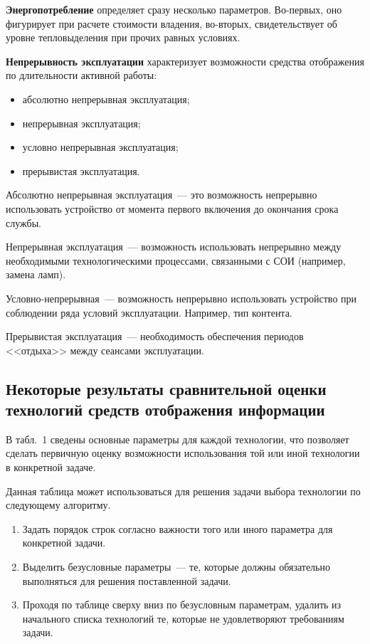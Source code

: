 \begin{multicols}{2}
   \textbf{Энергопотребление} определяет сразу несколько параметров. 
   Во-первых, оно фигурирует при расчете стоимости владения, во-вторых, 
свидетельствует об уровне тепловыделения при прочих равных условиях. 
   
   \textbf{Непрерывность эксплуатации} характеризует возможности 
средства отображения по длительности активной работы: 
   \begin{itemize}
\item абсолютно непрерывная эксплуатация;
\item непрерывная эксплуатация;
\item условно непрерывная эксплуатация;
\item прерывистая эксплуатация.
\end{itemize}
   
   Абсолютно непрерывная эксплуатация~--- это возможность непрерывно 
использовать устройство от момента первого включения до окончания срока 
службы. 
   
   Непрерывная эксплуатация~--- возможность использовать непрерывно 
между необходимыми технологическими процессами, связанными с СОИ 
(например, замена ламп). 
   
   Условно-непрерывная~--- возможность непрерывно использовать 
устройство при соблюдении ряда условий эксплуатации. Например, тип 
контента. 
   
   Прерывистая эксплуатация~--- необходимость обеспечения периодов 
<<отдыха>> между сеансами эксплуатации. 

\subsection{Некоторые результаты сравнительной оценки технологий 
средств отображения информации} %

     В табл.~1 сведены основные параметры для каж\-дой технологии, что 
позволяет сделать первичную оценку возможности использования той или 
иной технологии в конкретной задаче. 


     Данная таблица может использоваться для решения задачи выбора 
технологии по следующему алгоритму.
     \begin{enumerate}[1.]
\item Задать порядок строк согласно важности того или иного параметра для 
конкретной задачи. 
\item Выделить безусловные параметры~--- те, которые должны обязательно 
выполняться для решения поставленной задачи. 
\item Проходя по таблице сверху вниз по безусловным параметрам, удалить из 
начального списка технологий те, которые не удовлетворяют требованиям 
задачи.
\end{enumerate}

\end{multicols}

